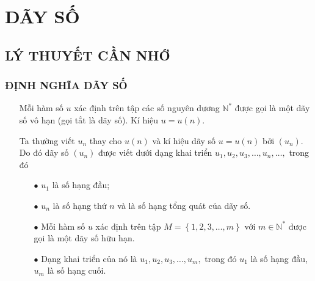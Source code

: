 \section{DÃY SỐ}
\subsection{LÝ THUYẾT CẦN NHỚ}
\subsubsection{ĐỊNH NGHĨA DÃY SỐ}
\begin{itemize}
	\item [\iconMT] Mỗi hàm số $u$ xác định trên tập các số nguyên dương $\mathbb{N}^*$ được gọi là một dãy số vô hạn (gọi tắt là dãy số). Kí hiệu $u=u(n )$.
	\begin{luuy}
		Ta thường viết $u_n$ thay cho $u(n)$ và kí hiệu dãy số $u=u(n)$ bởi $\left(u_n\right)$. Do đó dãy số $(u_n)$ được viết dưới dạng khai triển ${{u}_{1}},{{u}_{2}},{{u}_{3}},\ldots,{{u}_n},\ldots,$ trong đó
		\begin{gachsoc}
			\begin{itemize}
				\item [$\bullet$]  ${{u}_{1}}$ là số hạng đầu;
				\item [$\bullet$]  ${{u}_n}$ là số hạng thứ $n$ và là số hạng tổng quát của dãy số.
			\end{itemize}
		\end{gachsoc}
	\end{luuy}

	\item [\iconMT]  
	\begin{itemize}
		\item [$\bullet$] Mỗi hàm số $u$ xác định trên tập $M=\left\{ 1,2,3,\ldots,m \right\}$ với $m\in \mathbb{N}^*$ được gọi là một dãy số hữu hạn.
		\item [$\bullet$]  Dạng khai triển của nó là ${{u}_{1}},{{u}_{2}},{{u}_{3}},\ldots,{{u}_m},$ trong đó ${{u}_{1}}$ là số hạng đầu, ${{u}_m}$ là số hạng cuối.
	\end{itemize}
\end{itemize}

